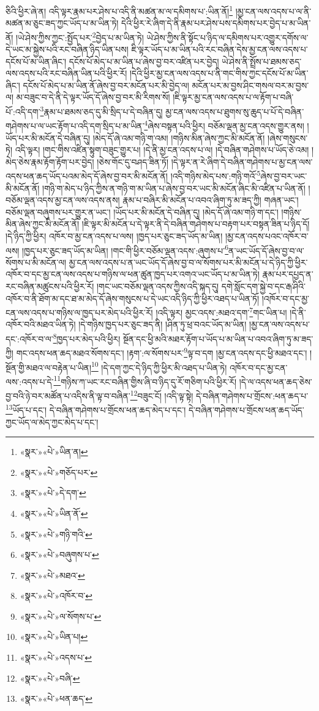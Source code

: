 ཅིའི་ཕྱིར་ཞེ་ན། འདི་ལྟར་རྣམ་པར་ཤེས་པ་འདི་ནི་མཚན་མ་ལ་དམིགས་པ་:ཡིན་ནོ།\footnote{«སྣར་»«པེ་»ཡིན་ན།} །མྱ་ངན་ལས་འདས་པ་ལ་ནི་མཚན་མ་ཅུང་ཟད་ཀྱང་ཡོད་པ་མ་ཡིན་ཏེ། དེའི་ཕྱིར་རེ་ཞིག་དེ་ནི་རྣམ་པར་ཤེས་པས་དམིགས་པར་བྱེད་པ་མ་ཡིན་ནོ། །ཡེ་ཤེས་ཀྱིས་ཀྱང་:སྤྱོད་པར་\footnote{«སྣར་»«པེ་»གཅོད་པར་}བྱེད་པ་མ་ཡིན་ཏེ། ཡེ་ཤེས་ཀྱིས་ནི་སྟོང་པ་ཉིད་ལ་དམིགས་པར་འགྱུར་དགོས་ལ་དེ་ཡང་མ་སྐྱེས་པའི་རང་བཞིན་ཉིད་ཡིན་པས། ཇི་ལྟར་ཡོད་པ་མ་ཡིན་པའི་རང་བཞིན་དེས་མྱ་ངན་ལས་འདས་པ་དངོས་པོ་མ་ཡིན་ཞིང་། དངོས་པོ་མེད་པ་མ་ཡིན་པ་ཞེས་བྱ་བར་འཛིན་པར་བྱེད། ཡེ་ཤེས་ནི་སྤྲོས་པ་ཐམས་ཅད་ལས་འདས་པའི་རང་བཞིན་ཡིན་པའི་ཕྱིར་རོ། །དེའི་ཕྱིར་མྱ་ངན་ལས་འདས་པ་ནི་གང་གིས་ཀྱང་དངོས་པོ་མ་ཡིན་ཞིང་། དངོས་པོ་མེད་པ་མ་ཡིན་ནོ་ཞེས་བྱ་བར་མངོན་པར་མི་བྱེད་ལ། མངོན་པར་མ་བྱས་ཤིང་གསལ་བར་མ་བྱས་ལ། མ་བཟུང་བ་དེ་ནི་དེ་ལྟར་ཡོད་དོ་ཞེས་བྱ་བར་མི་རིགས་སོ། །ཇི་ལྟར་མྱ་ངན་ལས་འདས་པ་ལ་རྟོག་པ་བཞི་པོ་:འདི་དག་\footnote{«སྣར་»«པེ་»དེ་དག་}རྣམ་པ་ཐམས་ཅད་དུ་མི་སྲིད་པ་དེ་བཞིན་དུ། མྱ་ངན་ལས་འདས་པ་ཐུགས་སུ་ཆུད་པ་པོ་དེ་བཞིན་གཤེགས་པ་ལ་ཡང་རྟོག་པ་འདི་དག་སྲིད་པ་མ་ཡིན་\footnote{«སྣར་»«པེ་»ཡིན་ནོ་}ཞེས་བསྟན་པའི་ཕྱིར། བཅོམ་ལྡན་མྱ་ངན་འདས་གྱུར་ནས། །ཡོད་པར་མི་མངོན་དེ་བཞིན་དུ། །མེད་དོ་ཞེ་འམ་གཉི་ག་འམ། །གཉིས་མིན་ཞེས་ཀྱང་མི་མངོན་ནོ། །ཞེས་གསུངས་ཏེ། འདི་ལྟར། །གང་གིས་འཛིན་སྟུག་བཟུང་གྱུར་པ། །དེ་ནི་མྱ་ངན་འདས་པ་ལ། །དེ་བཞིན་གཤེགས་པ་ཡོད་ཅེ་འམ། །མེད་ཅེས་རྣམ་རྟོག་རྟོག་པར་བྱེད། །ཅེས་གོང་དུ་བཤད་ཟིན་ཏོ། །དེ་ལྟར་ན་རེ་ཞིག་དེ་བཞིན་གཤེགས་པ་མྱ་ངན་ལས་འདས་ཕན་ཆད་ཡོད་པའམ་མེད་དོ་ཞེས་བྱ་བར་མི་མངོན་ནོ། །འདི་གཉིས་མེད་པས་:གཉི་གའོ་\footnote{«སྣར་»«པེ་»གཉི་གའི་}ཞེས་བྱ་བར་ཡང་མི་མངོན་ནོ། །གཉི་ག་མེད་པ་ཉིད་ཀྱིས་ན་གཉི་ག་མ་ཡིན་པ་ཞེས་བྱ་བར་ཡང་མི་མངོན་ཞིང་མི་འཛིན་པ་ཡིན་ནོ། །བཅོམ་ལྡན་འདས་མྱ་ངན་ལས་འདས་ནས། རྣམ་པ་བཞིར་མི་མངོན་པ་འབའ་ཞིག་ཏུ་མ་ཟད་ཀྱི། གཞན་ཡང་། བཅོམ་ལྡན་བཞུགས་པར་གྱུར་ན་ཡང་། །ཡོད་པར་མི་མངོན་དེ་བཞིན་དུ། །མེད་དོ་ཞེ་འམ་གཉི་ག་དང་། །གཉིས་མིན་ཞེས་ཀྱང་མི་མངོན་ནོ། །ཇི་ལྟར་མི་མངོན་པ་དེ་ལྟར་ནི་དེ་བཞིན་གཤེགས་པ་བརྟག་པར་བསྟན་ཟིན་པ་ཉིད་དོ། །དེ་ཉིད་ཀྱི་ཕྱིར། འཁོར་བ་མྱ་ངན་འདས་པ་ལས། །ཁྱད་པར་ཅུང་ཟད་ཡོད་མ་ཡིན། །མྱ་ངན་འདས་པའང་འཁོར་བ་ལས། །ཁྱད་པར་ཅུང་ཟད་ཡོད་མ་ཡིན། །གང་གི་ཕྱིར་བཅོམ་ལྡན་འདས་:ཞུགས་པ་\footnote{«སྣར་»«པེ་»བཞུགས་པ་}ན་ཡང་ཡོད་དོ་ཞེས་བྱ་བ་ལ་སོགས་པ་མི་མངོན་ལ། མྱ་ངན་ལས་འདས་པ་ན་ཡང་ཡོད་དོ་ཞེས་བྱ་བ་ལ་སོགས་པར་མི་མངོན་པ་དེ་ཉིད་ཀྱི་ཕྱིར་འཁོར་བ་དང་མྱ་ངན་ལས་འདས་པ་གཉིས་ལ་ཕན་ཚུན་ཁྱད་པར་འགའ་ཡང་ཡོད་པ་མ་ཡིན་ཏེ། རྣམ་པར་དཔྱད་ན་རང་བཞིན་མཚུངས་པའི་ཕྱིར་རོ། །གང་ཡང་བཅོམ་ལྡན་འདས་ཀྱིས་འདི་སྐད་དུ། དགེ་སློང་དག་སྐྱེ་བ་དང་རྒ་ཤིའི་འཁོར་བ་ནི་ཐོག་མ་དང་ཐ་མ་མེད་དོ་ཞེས་གསུངས་པ་དེ་ཡང་འདི་ཉིད་ཀྱི་ཕྱིར་འཐད་པ་ཡིན་ཏོ། །འཁོར་བ་དང་མྱ་ངན་ལས་འདས་པ་གཉིས་ལ་ཁྱད་པར་མེད་པའི་ཕྱིར་རོ། །འདི་ལྟར། མྱང་འདས་:མཐའ་དག་\footnote{«སྣར་»«པེ་»མཐའ་}གང་ཡིན་པ། །དེ་ནི་འཁོར་བའི་མཐའ་ཡིན་ཏེ། །དེ་གཉིས་ཁྱད་པར་ཅུང་ཟད་ནི། །ཤིན་ཏུ་ཕྲ་བའང་ཡོད་མ་ཡིན། །མྱ་ངན་ལས་འདས་པ་དང་:འཁོར་བ་ལ་\footnote{«སྣར་»«པེ་»འཁོར་བ་}ཁྱད་པར་མེད་པའི་ཕྱིར། སྔོན་དང་ཕྱི་མའི་མཐར་རྟོག་པ་ཡོད་པ་མ་ཡིན་པ་འབའ་ཞིག་ཏུ་མ་ཟད་ཀྱི། གང་འདས་ཕན་ཆད་མཐའ་སོགས་དང་། །རྟག་:ལ་སོགས་པར་\footnote{«སྣར་»«པེ་»ལ་སོགས་པ་}ལྟ་བ་དག །མྱ་ངན་འདས་དང་ཕྱི་མཐའ་དང་། །སྔོན་གྱི་མཐའ་ལ་བརྟེན་པ་ཡིན།\footnote{«སྣར་»«པེ་»ཡིན་པ།} །དེ་དག་ཀྱང་དེ་ཉིད་ཀྱི་ཕྱིར་མི་འཐད་པ་ཡིན་ཏེ། འཁོར་བ་དང་མྱ་ངན་ལས་:འདས་པ་དེ་\footnote{«སྣར་»«པེ་»འདས་པ་}གཉིས་ཀ་ཡང་རང་བཞིན་གྱིས་ཞི་བ་ཉིད་དུ་རོ་གཅིག་པའི་ཕྱིར་རོ། །དེ་ལ་འདས་ཕན་ཆད་ཅེས་བྱ་བའི་ཉེ་བར་མཚོན་པ་འདིས་ནི་ལྟ་བ་བཞིན་\footnote{«སྣར་»«པེ་»བཞི་}བཟུང་ངོ། །འདི་ལྟ་སྟེ། དེ་བཞིན་གཤེགས་པ་གྲོངས་:ཕན་ཆད་པ་\footnote{«སྣར་»«པེ་»ཕན་ཆད་}ཡོད་པ་དང་། དེ་བཞིན་གཤེགས་པ་གྲོངས་ཕན་ཆད་མེད་པ་དང་། དེ་བཞིན་གཤེགས་པ་གྲོངས་ཕན་ཆད་ཡོད་ཀྱང་ཡོད་ལ་མེད་ཀྱང་མེད་པ་དང་། 